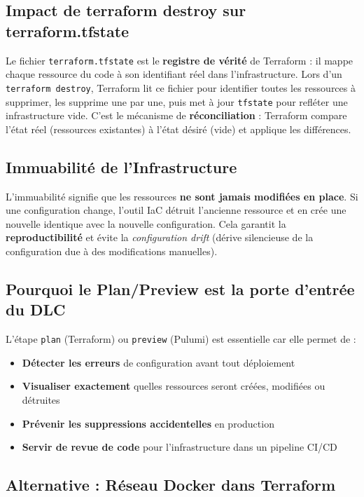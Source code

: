 \documentclass[12pt,a4paper]{article}
\begin{document}
\subsection{Impact de terraform destroy sur terraform.tfstate}

Le fichier \texttt{terraform.tfstate} est le \textbf{registre de vérité} de
Terraform : il mappe chaque ressource du code à son identifiant réel dans
l'infrastructure. Lors d'un \texttt{terraform destroy}, Terraform lit ce fichier
pour identifier toutes les ressources à supprimer, les supprime une par une,
puis met à jour \texttt{tfstate} pour refléter une infrastructure vide.
C'est le mécanisme de \textbf{réconciliation} : Terraform compare l'état réel
(ressources existantes) à l'état désiré (vide) et applique les différences.

\subsection{Immuabilité de l'Infrastructure}

L'immuabilité signifie que les ressources \textbf{ne sont jamais modifiées
en place}. Si une configuration change, l'outil IaC détruit l'ancienne ressource
et en crée une nouvelle identique avec la nouvelle configuration. Cela garantit
la \textbf{reproductibilité} et évite la \textit{configuration drift}
(dérive silencieuse de la configuration due à des modifications manuelles).

\subsection{Pourquoi le Plan/Preview est la porte d'entrée du DLC}

L'étape \texttt{plan} (Terraform) ou \texttt{preview} (Pulumi) est
essentielle car elle permet de :
\begin{itemize}
  \item \textbf{Détecter les erreurs} de configuration avant tout déploiement
  \item \textbf{Visualiser exactement} quelles ressources seront créées, modifiées ou détruites
  \item \textbf{Prévenir les suppressions accidentelles} en production
  \item \textbf{Servir de revue de code} pour l'infrastructure dans un pipeline CI/CD
\end{itemize}

\subsection{Alternative : Réseau Docker dans Terraform}
\end{document}
